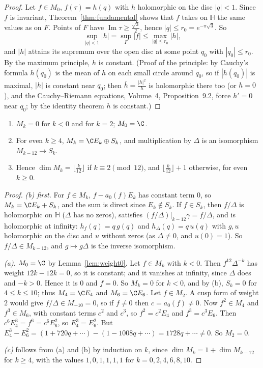 \begin{proof}
Let $f\in M_0$, $f(\tau)=h(q)$ with $h$ holomorphic on the disc $|q|<1$. Since $f$ is invariant, Theorem~\ref{thm:fundamental} shows that $f$ takes on $\mathbb H$ the same values as on $F$. Points of $F$ have
$\operatorname{Im}\tau\ge\frac{\sqrt3}2$, hence $|q|\le r_0=e^{-\pi\sqrt3}$. So
\[
\sup_{|q|<1}|h|=\sup_F|f|\le\max_{|q|\le r_0}|h|,
\]
and $|h|$ attains its supremum over the open disc at some point $q_0$ with $|q_0|\le r_0$. By the
maximum principle, $h$ is constant. (Proof of the principle: by Cauchy's formula $h(q_0)$ is the mean of $h$ on each small circle around $q_0$, so if $|h(q_0)|$ is maximal, $|h|$ is constant near $q_0$; then $\overline h=\frac{|h|^2}h$ is
holomorphic there too (or $h=0$), and the Cauchy--Riemann equations, Volume~4, Proposition~9.2, force $h'=0$ near $q_0$; by the identity theorem $h$ is constant.)
\end{proof}

\begin{theorem}\label{thm:dimension}
\begin{enumerate}[label=(\alph*)]
\item $M_k=0$ for $k<0$ and for $k=2$; $M_0=\C$.
\item For even $k\ge4$, $M_k=\C E_k\oplus S_k$, and multiplication by $\Delta$ is an isomorphism $M_{k-12}\to S_k$.
\item Hence $\dim M_k=\lfloor\frac k{12}\rfloor$ if $k\equiv2\pmod{12}$, and $\lfloor\frac k{12}\rfloor+1$ otherwise, for even $k\ge0$.
\end{enumerate}
\end{theorem}

\begin{proof}
\emph{(b) first.} For $f\in M_k$, $f-a_0(f)E_k$ has constant term $0$, so $M_k=\C E_k+S_k$, and the sum is direct since $E_k\notin S_k$. If $f\in S_k$, then $f/\Delta$ is holomorphic on $\mathbb H$ ($\Delta$ has no zeros), satisfies
$(f/\Delta)|_{k-12}\gamma=f/\Delta$, and is holomorphic at infinity: $h_f(q)=q\,g(q)$ and $h_\Delta(q)=q\,u(q)$ with $g,u$ holomorphic on the disc and $u$ without zeros (as $\Delta\ne0$, and $u(0)=1$). So $f/\Delta\in M_{k-12}$, and
$g\mapsto g\Delta$ is the inverse isomorphism.

\emph{(a).} $M_0=\C$ by Lemma~\ref{lem:weight0}. Let $f\in M_k$ with $k<0$. Then $f^{12}\Delta^{-k}$ has weight $12k-12k=0$, so it is constant; and it vanishes at infinity, since $\Delta$ does and $-k>0$. Hence it is $0$ and
$f=0$. So $M_k=0$ for $k<0$, and by (b), $S_k=0$ for $4\le k\le10$; thus $M_4=\C E_4$ and $M_6=\C E_6$. Let $f\in M_2$. A cusp form of weight $2$ would give $f/\Delta\in M_{-10}=0$, so if $f\ne0$ then $c=a_0(f)\ne0$. Now
$f^2\in M_4$ and $f^3\in M_6$, with constant terms $c^2$ and $c^3$, so $f^2=c^2E_4$ and $f^3=c^3E_6$. Then $c^6E_4^3=f^6=c^6E_6^2$, so $E_4^3=E_6^2$. But $E_4^3-E_6^2=(1+720q+\cdots)-(1-1008q+\cdots)=1728q+\cdots\ne0$.
So $M_2=0$.

\emph{(c)} follows from (a) and (b) by induction on $k$, since $\dim M_k=1+\dim M_{k-12}$ for $k\ge4$, with the values $1,0,1,1,1,1$ for $k=0,2,4,6,8,10$.
\end{proof}

